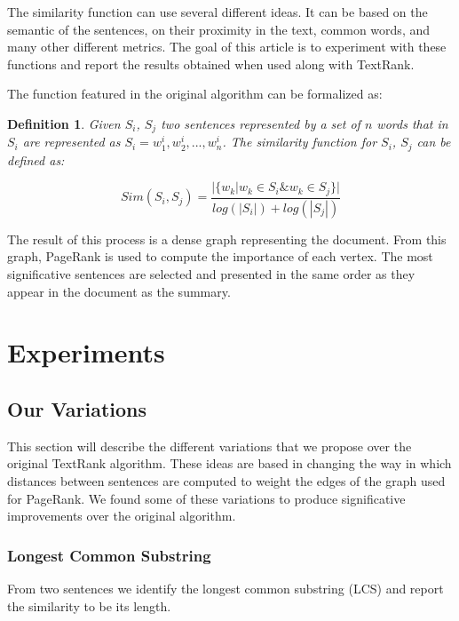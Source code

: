 \documentclass{llncs}
\newtheorem{definicion}{Definition}
\begin{document}
The similarity function can use several different ideas. It can be based on the semantic of the sentences, on their proximity in the text, common words, and many other different metrics. The goal of this article is to experiment with these functions and report the results obtained when used along with TextRank.

The function featured in the original algorithm can be formalized as:

\begin{definicion}
Given $S_i$, $S_j$ two sentences represented by a set of $n$ words that in 
$S_i$ are represented as $S_i = w_{1}^{i}, w_{2}^{i},..., w_{n}^{i}$. The similarity function for $S_i$, $S_j$ can be defined as:


\begin{equation}
Sim(S_{i},S_{j}) = \frac{ | \{   w_{k} | w_{k} \in S_{i} \& w_{k} \in S_{j}   \}  | }    
                              {  log(|S_{i}|) + log(|S_{j}|)  }
\end{equation}


\end{definicion}

The result of this process is a dense graph representing the document. From this graph, PageRank is used to compute the importance of each vertex. The most significative sentences are selected and presented in the same order as they appear in the document as the summary.


\section{Experiments}

\subsection{Our Variations}
This section will describe the different variations that we propose over the original TextRank algorithm. These ideas are based in changing the way in which distances between sentences are computed to weight the edges of the graph used for PageRank. We found some of these variations to produce significative improvements over the original algorithm.

\subsubsection{Longest Common Substring}
From two sentences we identify the longest common substring (LCS) and report the similarity to be its length.
\end{document}
